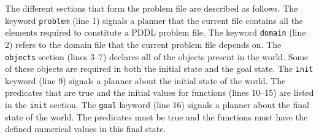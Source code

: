 The different sections that form the problem file are described as follows. The keyword 
\texttt{problem} (line 1) signals a planner that the current file contains all the elements 
required to constitute a PDDL problem file. The keyword \texttt{domain} (line 2) refers to 
the domain file that the current problem file depends on. The \texttt{objects} section (lines 3--7) 
declares all of the objects present in the world. Some of these objects are required in both the 
initial state and the goal state. The \texttt{init} keyword (line 9) signals a planner about 
the initial state of the world. The predicates that are true and the initial values for 
functions (lines 10--15) are listed in the \texttt{init} section. The \texttt{goal} keyword 
(line 16) signals a planner about the final state of the world. The predicates must be true 
and the functions must have the defined numerical values in this final state.


